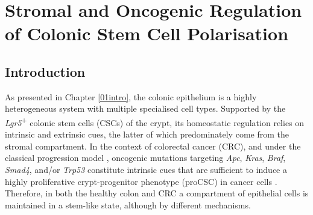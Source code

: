 \chapter{Stromal and Oncogenic Regulation of Colonic Stem Cell Polarisation}
\label{04seq}

\section{Introduction}



As presented in Chapter \ref{01intro}, the colonic epithelium is a highly heterogeneous system with multiple specialised cell types. Supported by the \emph{Lgr5}\textsuperscript{+} colonic stem cells (CSCs) of the crypt, its homeostatic regulation relies on intrinsic and extrinsic cues, the latter of which predominately come from the stromal compartment. In the context of colorectal cancer (CRC), and under the classical progression model \cite{fearon_genetic_1990}, oncogenic mutations targeting \textit{Apc}, \textit{Kras}, \textit{Braf}, \textit{Smad4}, and/or \textit{Trp53} constitute intrinsic cues that are sufficient to induce a highly proliferative crypt-progenitor phenotype (proCSC) in cancer cells \cite{van_de_wetering_-catenintcf-4_2002}.
Therefore, in both the healthy colon and CRC a compartment of epithelial cells is maintained in a stem-like state, although by different mechanisms. 

